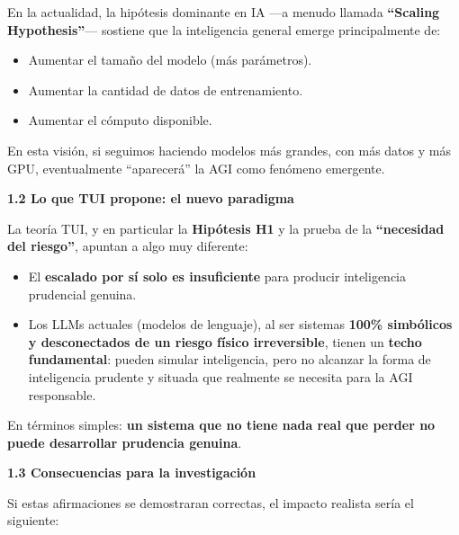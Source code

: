 En la actualidad, la hipótesis dominante en IA ---a menudo llamada
\textbf{``Scaling Hypothesis''}--- sostiene que la inteligencia general
emerge principalmente de:

\begin{itemize}
\item
  Aumentar el tamaño del modelo (más parámetros).
\item
  Aumentar la cantidad de datos de entrenamiento.
\item
  Aumentar el cómputo disponible.
\end{itemize}

En esta visión, si seguimos haciendo modelos más grandes, con más datos
y más GPU, eventualmente ``aparecerá'' la AGI como fenómeno emergente.

\textbf{1.2 Lo que TUI propone: el nuevo paradigma}

La teoría TUI, y en particular la \textbf{Hipótesis H1} y la prueba de
la \textbf{``necesidad del riesgo''}, apuntan a algo muy diferente:

\begin{itemize}
\item
  El \textbf{escalado por sí solo es insuficiente} para producir
  inteligencia prudencial genuina.
\item
  Los LLMs actuales (modelos de lenguaje), al ser sistemas \textbf{100\%
  simbólicos y desconectados de un riesgo físico irreversible}, tienen
  un \textbf{techo fundamental}: pueden simular inteligencia, pero no
  alcanzar la forma de inteligencia prudente y situada que realmente se
  necesita para la AGI responsable.
\end{itemize}

En términos simples: \textbf{un sistema que no tiene nada real que
perder no puede desarrollar prudencia genuina}.

\textbf{1.3 Consecuencias para la investigación}

Si estas afirmaciones se demostraran correctas, el impacto realista
sería el siguiente:

